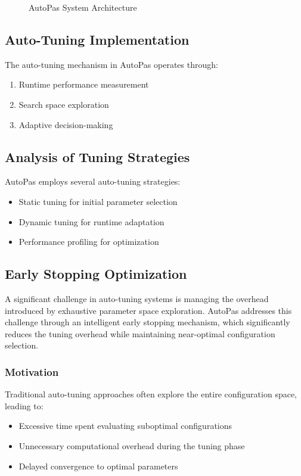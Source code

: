 \documentclass[conference]{IEEEtran}
\begin{document}
\begin{figure}[!t]
    \centering
    \caption{AutoPas System Architecture}
    \label{fig_architecture}
\end{figure}

\subsection{Auto-Tuning Implementation}
The auto-tuning mechanism in AutoPas operates through:

\begin{enumerate}
    \item Runtime performance measurement
    \item Search space exploration
    \item Adaptive decision-making
\end{enumerate}

\subsection{Analysis of Tuning Strategies}

AutoPas employs several auto-tuning strategies:

\begin{itemize}
    \item Static tuning for initial parameter selection
    \item Dynamic tuning for runtime adaptation
    \item Performance profiling for optimization
\end{itemize}



\subsection{Early Stopping Optimization}
A significant challenge in auto-tuning systems is managing the overhead introduced by exhaustive parameter space exploration. AutoPas addresses this challenge through an intelligent early stopping mechanism, which significantly reduces the tuning overhead while maintaining near-optimal configuration selection.

\subsubsection{Motivation}
Traditional auto-tuning approaches often explore the entire configuration space, leading to:
\begin{itemize}
    \item Excessive time spent evaluating suboptimal configurations
    \item Unnecessary computational overhead during the tuning phase
    \item Delayed convergence to optimal parameters
\end{itemize}
\end{document}
